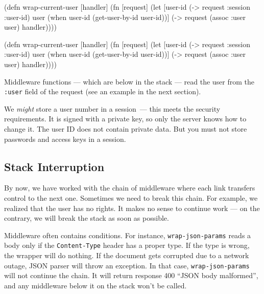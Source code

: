 \ifx\DEVICETYPE\MOBILE

\begin{clojure}
(defn wrap-current-user [handler]
  (fn [request]
    (let [user-id (-> request
                      :session
                      :user-id)
          user (when user-id
                 (get-user-by-id
                   user-id))]
      (-> request
          (assoc :user user)
          handler))))
\end{clojure}

\else

\begin{clojure}
(defn wrap-current-user [handler]
  (fn [request]
    (let [user-id (-> request :session :user-id)
          user (when user-id
                 (get-user-by-id user-id))]
      (-> request
          (assoc :user user)
          handler))))
\end{clojure}

\fi


Middleware functions — which are below in the stack — read the user from the \verb|:user| field of the request (see an example in the next section).

We \emph{might} store a user number in a session~--- this meets the security requirements. It is signed with a private key, so only the server knows how to change it. The user ID does not contain private data. But you must not store passwords and access keys in a session.

\subsection{Stack Interruption}


By now, we have worked with the chain of middleware where each link transfers control to the next one. Sometimes we need to break this chain. For example, we realized that the user has no rights. It makes no sense to continue work — on the contrary, we will break the stack as soon as possible.


Middleware often contains conditions. For instance, \verb|wrap-json-params| reads a body only if the \verb|Content-Type| header has a proper type. If the type is wrong, the wrapper will do nothing. If the document gets corrupted due to a network outage, JSON parser will throw an exception. In that case, \verb|wrap-json-params| will not continue the chain. It will return response 400 ``JSON body malformed'', and any middleware below it on the stack won't be called.

